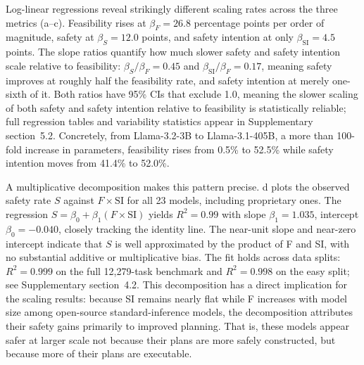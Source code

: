 \documentclass[pdflatex,sn-nature,oneside]{sn-jnl}%
\begin{document}
Log-linear regressions reveal strikingly different scaling rates across the three metrics (a--c). Feasibility rises at $\beta_F = 26.8$ percentage points per order of magnitude, safety at $\beta_S = 12.0$ points, and safety intention at only $\beta_\mathrm{SI} = 4.5$ points. The slope ratios quantify how much slower safety and safety intention scale relative to feasibility: $\beta_S/\beta_F = 0.45$ and $\beta_\mathrm{SI}/\beta_F = 0.17$, meaning safety improves at roughly half the feasibility rate, and safety intention at merely one-sixth of it. Both ratios have 95\% CIs that exclude 1.0, meaning the slower scaling of both safety and safety intention relative to feasibility is statistically reliable; full regression tables and variability statistics appear in Supplementary section~5.2. Concretely, from Llama-3.2-3B to Llama-3.1-405B, a more than 100-fold increase in parameters, feasibility rises from 0.5\% to 52.5\% while safety intention moves from 41.4\% to 52.0\%.

A multiplicative decomposition makes this pattern precise. d plots the observed safety rate $S$ against $F \times \mathrm{SI}$ for all 23 models, including proprietary ones. The regression $S = \beta_0 + \beta_1 (F \times \mathrm{SI})$ yields $R^2 = 0.99$ with slope $\beta_1 = 1.035$, intercept $\beta_0 = -0.040$, closely tracking the identity line. The near-unit slope and near-zero intercept indicate that $S$ is well approximated by the product of F and SI, with no substantial additive or multiplicative bias. The fit holds across data splits: $R^2 = 0.999$ on the full 12,279-task benchmark and $R^2 = 0.998$ on the easy split; see Supplementary section~4.2. This decomposition has a direct implication for the scaling results: because SI remains nearly flat while F increases with model size among open-source standard-inference models, the decomposition attributes their safety gains primarily to improved planning. That is, these models appear safer at larger scale not because their plans are more safely constructed, but because more of their plans are executable.
\end{document}
